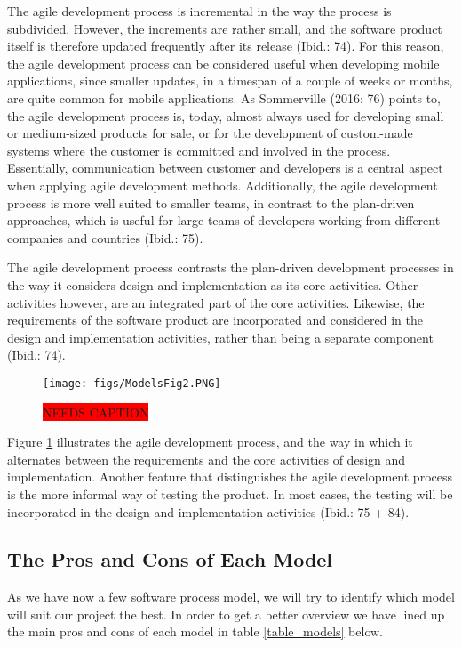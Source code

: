 The agile development process is incremental in the way the process is subdivided. However, the increments are rather small, and the software product itself is therefore updated frequently after its release (Ibid.: 74). For this reason, the agile development process can be considered useful when developing mobile applications, since smaller updates, in a timespan of a couple of weeks or months, are quite common for mobile applications. As Sommerville (2016: 76) points to, the agile development process is, today, almost always used for developing small or medium-sized products for sale, or for the development of custom-made systems where the customer is committed and involved in the process. Essentially, communication between customer and developers is a central aspect when applying agile development methods. Additionally, the agile development process is more well suited to smaller teams, in contrast to the plan-driven approaches, which is useful for large teams of developers working from different companies and countries (Ibid.: 75).

The agile development process contrasts the plan-driven development processes in the way it considers design and implementation as its core activities. Other activities however, are an integrated part of the core activities. Likewise, the requirements of the software product are incorporated and considered in the design and implementation activities, rather than being a separate component (Ibid.: 74).

\begin{figure}
  \centering
  \texttt{[image: figs/ModelsFig2.PNG]}
  \caption{\colorbox{red}{NEEDS CAPTION}}
  \label{ModelsFig2}
\end{figure}

Figure \ref{ModelsFig2} illustrates the agile development process, and the way in which it alternates between the requirements and the core activities of design and implementation. Another feature that distinguishes the agile development process is the more informal way of testing the product. In most cases, the testing will be incorporated in the design and implementation activities (Ibid.: 75 + 84).


\subsection{The Pros and Cons of Each Model}
As we have now a few software process model, we will try to identify which model will suit our project the best. In order to get a better overview we have lined up the main pros and cons of each model in table \ref{table_models} below.

